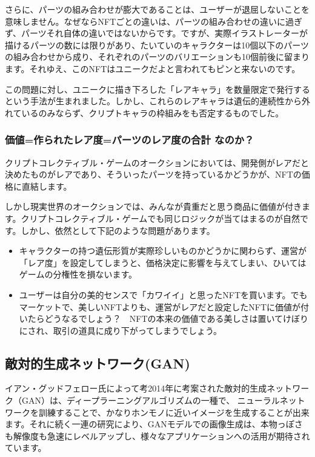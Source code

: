 \documentclass[xelatex,ja=standard]{bxjsarticle}
\begin{document}
さらに、パーツの組み合わせが膨大であることは、ユーザーが退屈しないことを意味しません。なぜならNFTごとの違いは、パーツの組み合わせの違いに過ぎず、パーツそれ自体の違いではないからです。ですが、実際イラストレーターが描けるパーツの数には限りがあり、たいていのキャラクターは10個以下のパーツの組み合わせから成り、それぞれのパーツのバリエーションも10個前後に留まります。それゆえ、このNFTはユニークだよと言われてもピンと来ないのです。

この問題に対し、ユニークに描き下ろした「レアキャラ」を数量限定で発行するという手法が生まれました。しかし、これらのレアキャラは遺伝的連続性から外れているのみならず、クリプトキャラの枠組みをも否定するものでした。

\subsubsection{価値=作られたレア度=パーツのレア度の合計 なのか？}

クリプトコレクティブル・ゲームのオークションにおいては、開発側がレアだと決めたものがレアであり、そういったパーツを持っているかどうかが、NFTの価格に直結します。

しかし現実世界のオークションでは、みんなが貴重だと思う商品に価値が付きます。クリプトコレクティブル・ゲームでも同じロジックが当てはまるのが自然です。しかし、依然として下記のような問題があります。


\begin{itemize}
\item キャラクターの持つ遺伝形質が実際珍しいものかどうかに関わらず、運営が「レア度」を設定してしまうと、価格決定に影響を与えてしまい、ひいてはゲームの分権性を損ないます。
\item ユーザーは自分の美的センスで「カワイイ」と思ったNFTを買います。でもマーケットで、美しいNFTよりも、運営がレアだと設定したNFTに価値が付いたらどうなるでしょう？　NFTの本来の価値である美しさは置いてけぼりにされ、取引の道具に成り下がってしまうでしょう。
\end{itemize}

\subsection{敵対的生成ネットワーク(GAN)}
イアン・グッドフェロー氏によって考2014年に考案された敵対的生成ネットワーク（GAN）\cite{goodfellow2014generative}は、ディープラーニングアルゴリズムの一種で、 ニューラルネットワークを訓練することで、かなりホンモノに近いイメージを生成することが出来ます。それに続く一連の研究により、GANモデルでの画像生成は、本物っぽさも解像度も急速にレベルアップし\cite{radford2015unsupervised,karras2017progressive}、様々なアプリケーションへの活用が期待されています。
\end{document}
